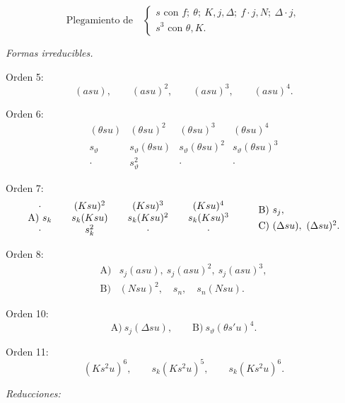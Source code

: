 \documentclass[11pt]{article}
\newcommand{\A}{\Delta}
\begin{document}
\[
\text{Plegamiento de}\quad
\left\{\begin{array}{l}
s\text{ con } f;\ \theta;\ K,j,\A;\ f\cdot j,N;\ \A\cdot j,\\
s^3\text{ con }\theta,K.
\end{array}\right.
\]

\noindent\emph{Formas irreducibles.}

\noindent Orden 5:
\[
(asu),\qquad (asu)^2,\qquad (asu)^3,\qquad (asu)^4.
\]

\noindent Orden 6:
\[
\begin{array}{cccc}
(\theta su)&(\theta su)^2&(\theta su)^3&(\theta su)^4\\
s_\vartheta&s_\vartheta(\theta su)&s_\vartheta(\theta su)^2&s_\vartheta(\theta su)^3\\
\cdot&s_\vartheta^2&\cdot&\cdot
\end{array}
\]

\noindent Orden 7:
\[
\begin{array}{c@{\qquad}c@{\qquad}c@{\qquad}c}
\cdot&(Ksu)^2&(Ksu)^3&(Ksu)^4\\
\text{A)}\ s_k&s_k(Ksu)&s_k(Ksu)^2&s_k(Ksu)^3\\
\cdot&s_k^2&\cdot&\cdot
\end{array}
\qquad
\begin{array}{l}
\text{B)}\ s_j,\\[0.4em]
\text{C)}\ (\A su),\ (\A su)^2.
\end{array}
\]

\noindent Orden 8:
\[
\begin{array}{ll}
\text{A)}&s_j(asu),\ s_j(asu)^2,\ s_j(asu)^3,\\[0.4em]
\text{B)}&(Nsu)^2,\quad s_n,\quad s_n(Nsu).
\end{array}
\]

\noindent Orden 10:
\[
\text{A)}\ s_j(\A su),\qquad \text{B)}\ s_\vartheta(\theta s'u)^4.
\]

\noindent Orden 11:
\[
(Ks^2u)^6,\qquad s_k(Ks^2u)^5,
\qquad s_k(Ks^2u)^6.
\]

\noindent\emph{Reducciones:}
\end{document}
